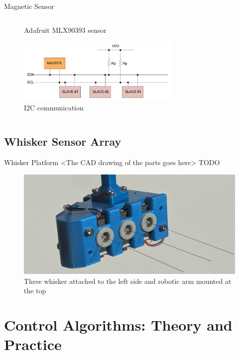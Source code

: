\documentclass[AIRbeamer
,optEnglish
,optBiber
,optBibstyleAlphabetic
,optBeamerClassicFormat%
]{AIRlatex}
\begin{document}
\begin{frame}{Magnetic Sensor}
\begin{columns}[T,onlytextwidth]
\begin{column}[T]{0.4\textwidth}
\begin{figure}[H]
                    \caption{Adafruit MLX90393 sensor}
                \end{figure}
                \vskip-0.5cm
                \begin{figure}[H]
                    \centering
                    \includegraphics[width=0.7\textwidth]{figures/i2c}
                    \caption{I2C communication}
                \end{figure}
            \end{column}
        \end{columns}
    \end{frame}

    \subsection{Whisker Sensor Array}

    \begin{frame}{Whisker Platform}
        <The CAD drawing of the parts goes here>
        \alert{TODO}

        \begin{figure}[ht]
            \centering
            \includegraphics[width=0.6\textheight]{figures/platform}
            \caption{Three whisker attached to the left side and robotic arm mounted at the top}
        \end{figure}
    \end{frame}


    \section{Control Algorithms: Theory and Practice}
\end{document}
